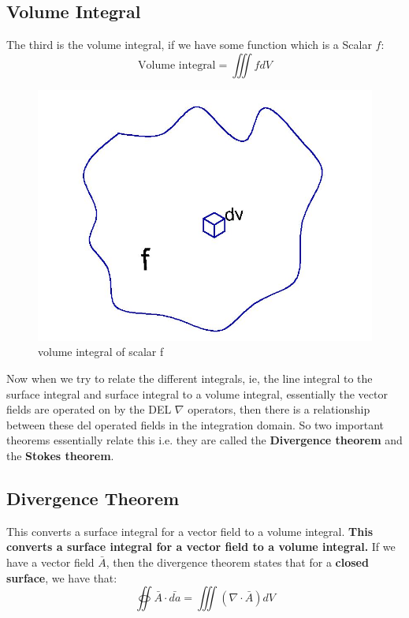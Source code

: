 \subsection{Volume Integral}
The third is the volume integral, if we have some function which is a Scalar $f$:
\begin{dmath*}
\text{Volume integral} = \iiint fdV
\end{dmath*}

\begin{figure}
\centering
\includegraphics[width=0.7\linewidth]{graphics/fig175}
\caption{volume integral of scalar f}
\label{fig:page-8}
\end{figure}

Now when we try to relate the different integrals, ie, the line integral to the surface integral and surface integral to a volume integral, essentially the vector fields are operated on by the DEL $\nabla$ operators, then there is a relationship between these del operated fields in the integration domain. So two important theorems essentially relate this i.e. they are called the \textbf{Divergence theorem} and the \textbf{Stokes theorem}.

\subsection {Divergence Theorem}
This converts a surface integral for a vector field to a volume integral. \textbf{This converts a surface integral for a vector field to a volume integral.} If we have a vector field $\bar{A}$, then the divergence theorem states that for a \textbf{closed surface}, we have that:
\begin{equation}
\oiint \bar{A} \cdot \bar{da} = \iiint (\nabla \cdot \bar{A})dV
\end{equation}


